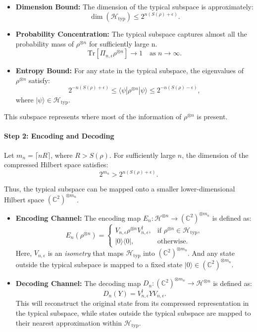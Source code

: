 \begin{itemize}
    \item \textbf{Dimension Bound:}
    The dimension of the typical subspace is approximately:
    \[
    \dim(\mathcal{H}_{\text{typ}}) \leq 2^{n(S(\rho) + \epsilon)}.
    \]

    \item \textbf{Probability Concentration:}
    The typical subspace captures almost all the probability mass of \(\rho^{\otimes n}\) for sufficiently large n.
    \[
    \text{Tr}[\Pi_{n, \epsilon} \rho^{\otimes n}] \to 1 \quad \text{as } n \to \infty.
    \]

    \item \textbf{Entropy Bound:}
    For any state in the typical subspace, the eigenvalues of \(\rho^{\otimes n}\) satisfy:
    \[
    2^{-n(S(\rho) + \epsilon)} \leq \langle \psi | \rho^{\otimes n} | \psi \rangle \leq 2^{-n(S(\rho) - \epsilon)},
    \]
    where \(|\psi\rangle \in \mathcal{H}_{\text{typ}}\).
\end{itemize}

This subspace represents where most of the information of \(\rho^{\otimes n}\) is present.

\paragraph{Step 2: Encoding and Decoding}

Let \(m_n = \lceil n R \rceil\), where \(R > S(\rho)\). For sufficiently large \(n\), the dimension of the compressed Hilbert space satisfies:
\[
2^{m_n} > 2^{n(S(\rho) + \epsilon)}.
\]

Thus, the typical subspace can be mapped onto a smaller lower-dimensional Hilbert space \((\mathbb{C}^2)^{\otimes m_n}\).

\begin{itemize}
    \item \textbf{Encoding Channel:}
    The encoding map \(E_n : \mathcal{H}^{\otimes n} \to (\mathbb{C}^2)^{\otimes m_n}\) is defined as:
    \[
    E_n(\rho^{\otimes n}) =
    \begin{cases}
        V_{n, \epsilon} \rho^{\otimes n} V_{n, \epsilon}^\dagger, & \text{if } \rho^{\otimes n} \in \mathcal{H}_{\text{typ}}, \\
        |0\rangle \langle 0|, & \text{otherwise}.
    \end{cases}
    \]
    Here, \(V_{n, \epsilon}\) is an \textit{isometry} that maps \(\mathcal{H}_{\text{typ}}\) into \((\mathbb{C}^2)^{\otimes m_n}\). And any state outside the typical subspace is mapped to a fixed state \(|0\rangle \in (\mathbb{C}^2)^{\otimes m_n}\).

    \item \textbf{Decoding Channel:}
    The decoding map \(D_n : (\mathbb{C}^2)^{\otimes m_n} \to \mathcal{H}^{\otimes n}\) is defined as:
    \[
    D_n(Y) = V_{n, \epsilon}^\dagger Y V_{n, \epsilon}.
    \]
This will reconstruct the original state from its compressed representation in the typical subspace, while states outside the typical subspace are mapped to their nearest approximation within  \(\mathcal{H}_{\text{typ}}\).
\end{itemize}

